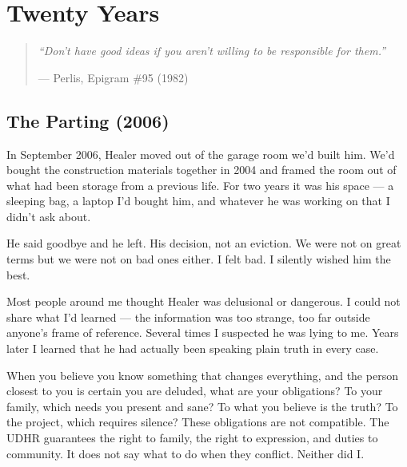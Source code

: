 \chapter{Twenty Years}
\label{pos29:twenty-years}

\begin{quote}\small\textit{%
``Don't have good ideas if you aren't willing to be responsible for them.''%
}\par\raggedleft --- Perlis, Epigram \#95 (1982)\end{quote}

\vspace{0.5cm}

\section*{The Parting (2006)}
\label{pos29:the-parting}

In September 2006, Healer moved out of the garage room we'd built him. We'd bought the construction materials together in 2004 and framed the room out of what had been storage from a previous life. For two years it was his space --- a sleeping bag, a laptop I'd bought him, and whatever he was working on that I didn't ask about.


He said goodbye and he left. His decision, not an eviction. We were not on great terms but we were not on bad ones either. I felt bad. I silently wished him the best.

Most people around me thought Healer was delusional or dangerous. I could not share what I'd learned --- the information was too strange, too far outside anyone's frame of reference. Several times I suspected he was lying to me. Years later I learned that he had actually been speaking plain truth in every case.

When you believe you know something that changes everything, and the person closest to you is certain you are deluded, what are your obligations? To your family, which needs you present and sane? To what you believe is the truth? To the project, which requires silence? These obligations are not compatible. The UDHR guarantees the right to family, the right to expression, and duties to community. It does not say what to do when they conflict. Neither did I.



